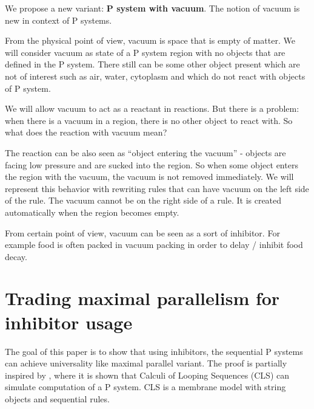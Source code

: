 \documentclass[a4paper,10pt]{article}
\begin{document}
\vspace*{\baselineskip}

We propose a new variant: {\bf P system with vacuum}. The notion of vacuum is new in context of P systems.

From the physical point of view, vacuum is space that is empty of matter. We will consider vacuum as state of a P system region with no objects that are defined in the P system. There still can be some other object present which are not of interest such as air, water, cytoplasm and which do not react with objects of P system.

We will allow vacuum to act as a reactant in reactions. But there is a problem: when there is a vacuum in a region, there is no other object to react with. So what does the reaction with vacuum mean?

The reaction can be also seen as ``object entering the vacuum'' - objects are facing low pressure and are sucked into the region. So when some object enters the region with the vacuum, the vacuum is not removed immediately. We will represent this behavior with rewriting rules that can have vacuum on the left side of the rule. The vacuum cannot be on the right side of a rule. It is created automatically when the region becomes empty.

From certain point of view, vacuum can be seen as a sort of inhibitor. For example food is often packed in vacuum packing in order to delay / inhibit food decay.

\section{Trading maximal parallelism for inhibitor usage}
\label{sec:inhibitors}
The goal of this paper is to show that using inhibitors, the sequential P systems can achieve universality like maximal parallel variant. The proof is partially inspired by \cite{Barbuti07thecalculus}, where it is shown that Calculi of Looping Sequences (CLS) can simulate computation of a P system. CLS is a membrane model with string objects and sequential rules.
\end{document}
